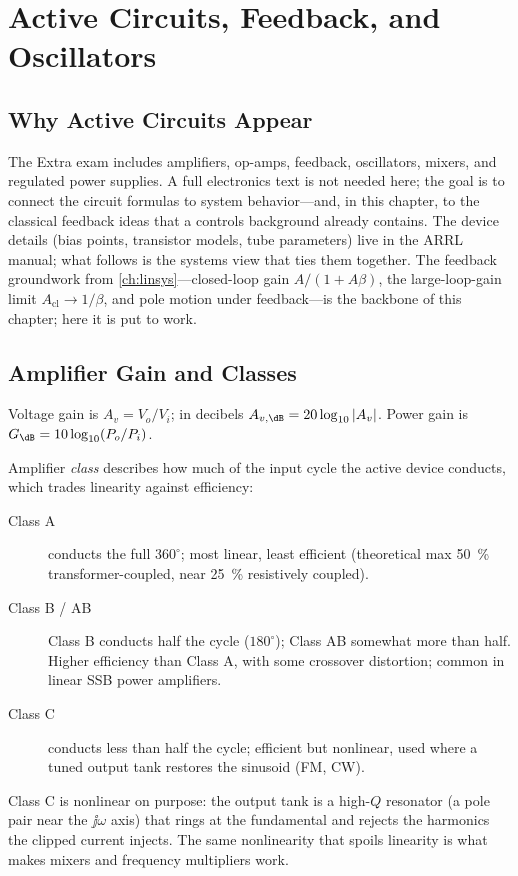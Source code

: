 \chapter{Active Circuits, Feedback, and Oscillators}
\label{ch:active}
\section{Why Active Circuits Appear}
The Extra exam includes amplifiers, op-amps, feedback, oscillators, mixers, and
regulated power supplies. A full electronics text is not needed here; the goal is
to connect the circuit formulas to system behavior---and, in this chapter, to the
classical feedback ideas that a controls background already contains. The device
details (bias points, transistor models, tube parameters) live in the ARRL
manual; what follows is the systems view that ties them together. The feedback
groundwork from \cref{ch:linsys}---closed-loop gain \(A/(1+A\beta)\), the
large-loop-gain limit \(A_{\text{cl}}\to1/\beta\), and pole motion under
feedback---is the backbone of this chapter; here it is put to work.

\section{Amplifier Gain and Classes}
Voltage gain is \(A_v=V_o/V_i\); in decibels \(A_{v,\dB}=20\log_{10}|A_v|\). Power
gain is \(G_{\dB}=10\log_{10}(P_o/P_i)\).

Amplifier \emph{class} describes how much of the input cycle the active device
conducts, which trades linearity against efficiency:
\begin{description}
\item[Class A] conducts the full \(360^\circ\); most linear, least efficient
(theoretical max \SI{50}{\percent} transformer-coupled, near \SI{25}{\percent}
resistively coupled).
\item[Class B / AB] Class B conducts half the cycle (\(180^\circ\)); Class AB
somewhat more than half. Higher efficiency than Class A, with some crossover
distortion; common in linear SSB power amplifiers.
\item[Class C] conducts less than half the cycle; efficient but nonlinear, used
where a tuned output tank restores the sinusoid (FM, CW).
\end{description}
Class C is nonlinear on purpose: the output tank is a high-\(Q\) resonator (a
pole pair near the \(\jj\omega\) axis) that rings at the fundamental and rejects
the harmonics the clipped current injects. The same nonlinearity that spoils
linearity is what makes mixers and frequency multipliers work.

